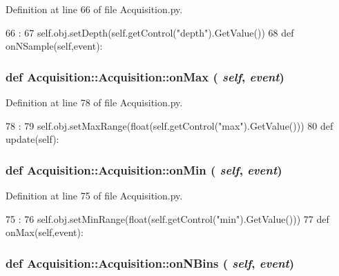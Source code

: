 Definition at line 66 of file Acquisition.py.


\begin{DoxyCode}
66                            :
67         self.obj.setDepth(self.getControl("depth").GetValue()) 
68 
    def onNSample(self,event):
\end{DoxyCode}
\hypertarget{classAcquisition_1_1Acquisition_ae0168d4b34ac27c32e84af4a506efd8a}{
\subsubsection[{onMax}]{\setlength{\rightskip}{0pt plus 5cm}def Acquisition::Acquisition::onMax ( {\em self}, \/   {\em event})}}
\label{classAcquisition_1_1Acquisition_ae0168d4b34ac27c32e84af4a506efd8a}


Definition at line 78 of file Acquisition.py.


\begin{DoxyCode}
78                          :
79         self.obj.setMaxRange(float(self.getControl("max").GetValue()))  
80 
    def update(self):
\end{DoxyCode}
\hypertarget{classAcquisition_1_1Acquisition_aa6892d520baf0639d63433430e14e838}{
\subsubsection[{onMin}]{\setlength{\rightskip}{0pt plus 5cm}def Acquisition::Acquisition::onMin ( {\em self}, \/   {\em event})}}
\label{classAcquisition_1_1Acquisition_aa6892d520baf0639d63433430e14e838}


Definition at line 75 of file Acquisition.py.


\begin{DoxyCode}
75                          :
76         self.obj.setMinRange(float(self.getControl("min").GetValue()))  
77 
    def onMax(self,event):
\end{DoxyCode}
\hypertarget{classAcquisition_1_1Acquisition_a82d37801e9581783b2b08ed36ea37eb9}{
\subsubsection[{onNBins}]{\setlength{\rightskip}{0pt plus 5cm}def Acquisition::Acquisition::onNBins ( {\em self}, \/   {\em event})}}
\label{classAcquisition_1_1Acquisition_a82d37801e9581783b2b08ed36ea37eb9}


